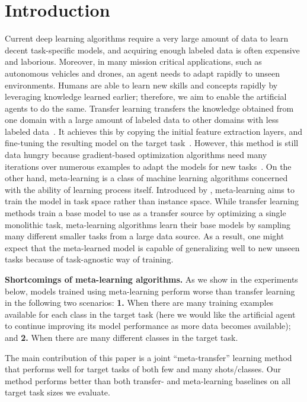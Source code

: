\documentclass[letterpaper]{article}
\begin{document}
\section{Introduction}
Current deep learning algorithms require a very large amount of data to learn decent task-specific models, and acquiring enough labeled data is often expensive and laborious. Moreover, in many mission critical applications, such as autonomous vehicles and drones, an agent needs to adapt rapidly to unseen environments. Humans are able to learn new skills and concepts rapidly by leveraging knowledge learned earlier; therefore, we aim to enable the artificial agents to do the same. Transfer learning transfers the knowledge obtained from one domain with a large amount of labeled data to other domains with less labeled data~\cite{Pan}. It achieves this by copying the initial feature extraction layers, and fine-tuning the resulting model on the target task~\cite{Yosinski}. However, this method is still data hungry because gradient-based optimization algorithms need many iterations over numerous examples to adapt the models for new tasks~\cite{Ravi}. On the other hand, meta-learning is a class of machine learning algorithms concerned with the ability of learning process itself. Introduced by \cite{Schmidhuber}, meta-learning aims to train the model in task space rather than instance space. While transfer learning methods train a base model to use as a transfer source by optimizing a single monolithic task, meta-learning algorithms learn their base models by sampling many different smaller tasks from a large data source. As a result, one might expect that the meta-learned model is capable of generalizing well to new unseen tasks because of task-agnostic way of training.

\textbf{Shortcomings of meta-learning algorithms.} As we show in the experiments below, models trained using meta-learning perform worse than transfer learning in the following two scenarios: \textbf{1.} When there are many training examples available for each class in the target task (here we would like the artificial agent to continue improving its model performance as more data becomes available); and \textbf{2.} When there are many different classes in the target task.

The main contribution of this paper is a joint ``meta-transfer'' learning method that performs well for target tasks of both few and many shots/classes. Our method performs better than both transfer- and meta-learning baselines on all target task sizes we evaluate.
\end{document}
